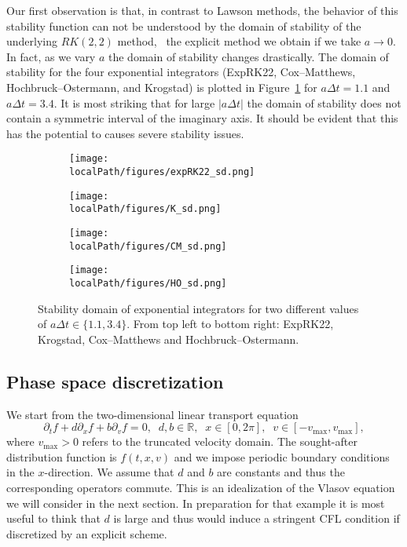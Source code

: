 Our first observation is that, in contrast to Lawson methods, the behavior of this stability function can not be understood by the domain of stability of the underlying $RK(2, 2)$ method, \ie~the explicit method we obtain if we take $a \to 0$. In fact, as we vary $a$ the domain of stability changes drastically. The domain of stability for the four exponential integrators (ExpRK22, Cox--Matthews, Hochbruck--Ostermann, and Krogstad) is plotted in Figure~\ref{fig:expRK_sd} for $a\Delta t=1.1$ and $a\Delta t=3.4$. It is most striking that for large $\vert a\Delta t \vert$ the domain of stability does not contain a symmetric interval of the imaginary axis. It should be evident that this has the potential to causes severe stability issues.

\begin{figure}[h]
	\centering
	\begin{subfigure}[b]{0.3\textwidth}
		\centering \texttt{[image: \\localPath/figures/expRK22\_sd.png]}
	\end{subfigure}
	\begin{subfigure}[b]{0.3\textwidth}
		\centering \texttt{[image: \\localPath/figures/K\_sd.png]}
	\end{subfigure}

	\begin{subfigure}[b]{0.3\textwidth}
		\centering \texttt{[image: \\localPath/figures/CM\_sd.png]}
	\end{subfigure}
		\begin{subfigure}[b]{0.3\textwidth}
		\centering \texttt{[image: \\localPath/figures/HO\_sd.png]}
	\end{subfigure}
    \caption{Stability domain of exponential integrators for two different values of $a\Delta t\in\{1.1, 3.4\}$.  From top left to bottom right: ExpRK22,  Krogstad, Cox--Matthews and Hochbruck--Ostermann.}  
	\label{fig:expRK_sd}
\end{figure}




\subsection{Phase space discretization}

We start from the two-dimensional linear transport equation
\begin{equation}
	\label{vp_linear}
    \partial_t f + d\partial_x f + b\partial_v f = 0, \;\; d, b\in\mathbb{R}, \;\; x\in [0, 2 \pi], \;\; v\in [-v_{\max},v_{\max}], 
\end{equation}
where $v_{\max}>0$  refers to the truncated velocity domain. 
The sought-after distribution function is $f(t,x,v)$ and we impose periodic boundary conditions in the $x$-direction. We assume that $d$ and $b$ are constants and thus the corresponding operators commute. This is an idealization of the Vlasov equation we will consider in the next section. In preparation for that example it is most useful to think that $d$ is large and thus would induce a stringent CFL condition if discretized by an explicit scheme.

